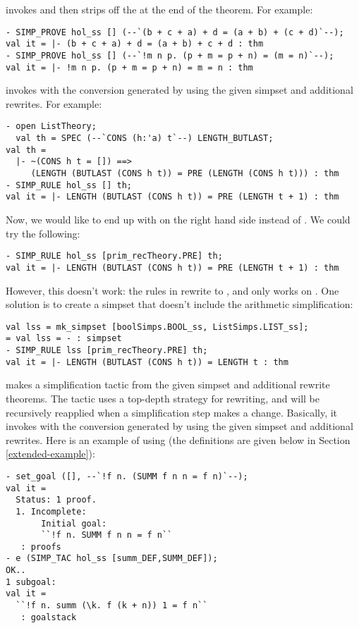  invokes  and then strips off the
 at the end of the theorem. For example:
\begin{verbatim}
- SIMP_PROVE hol_ss [] (--`(b + c + a) + d = (a + b) + (c + d)`--);
val it = |- (b + c + a) + d = (a + b) + c + d : thm
- SIMP_PROVE hol_ss [] (--`!m n p. (p + m = p + n) = (m = n)`--);
val it = |- !m n p. (p + m = p + n) = m = n : thm
\end{verbatim}

 invokes  with the conversion generated
by  using the given simpset and additional rewrites. For
example:
\begin{verbatim}
- open ListTheory;
  val th = SPEC (--`CONS (h:'a) t`--) LENGTH_BUTLAST;
val th =
  |- ~(CONS h t = []) ==>
     (LENGTH (BUTLAST (CONS h t)) = PRE (LENGTH (CONS h t))) : thm
- SIMP_RULE hol_ss [] th;
val it = |- LENGTH (BUTLAST (CONS h t)) = PRE (LENGTH t + 1) : thm
\end{verbatim}
Now, we would like to end up with  on the right hand side
instead of . We could try the following:
\begin{verbatim}
- SIMP_RULE hol_ss [prim_recTheory.PRE] th;
val it = |- LENGTH (BUTLAST (CONS h t)) = PRE (LENGTH t + 1) : thm
\end{verbatim}
However, this doesn't work: the rules in  rewrite  to
, and  only works on . One solution is to
create a simpset that doesn't include the arithmetic simplification:
\begin{verbatim}
val lss = mk_simpset [boolSimps.BOOL_ss, ListSimps.LIST_ss];
= val lss = - : simpset
- SIMP_RULE lss [prim_recTheory.PRE] th;
val it = |- LENGTH (BUTLAST (CONS h t)) = LENGTH t : thm
\end{verbatim}

 makes a simplification tactic from the given simpset
and additional rewrite theorems. The tactic uses a top-depth strategy
for rewriting, and will be recursively reapplied when a simplification
step makes a change. Basically, it invokes  with the
conversion generated by  using the given simpset and
additional rewrites. Here is an example of using  (the
definitions are given below in Section \ref{extended-example}):
\begin{verbatim}
- set_goal ([], --`!f n. (SUMM f n n = f n)`--);
val it =
  Status: 1 proof.
  1. Incomplete:
       Initial goal:
       ``!f n. SUMM f n n = f n``
   : proofs
- e (SIMP_TAC hol_ss [summ_DEF,SUMM_DEF]);
OK..
1 subgoal:
val it =
  ``!f n. summ (\k. f (k + n)) 1 = f n``
   : goalstack
\end{verbatim}

